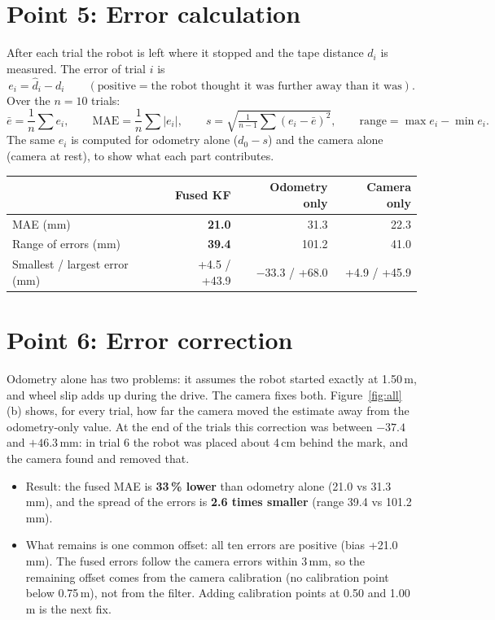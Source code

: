 \documentclass[11pt,a4paper]{article}
\begin{document}
\section{Point 5: Error calculation}
After each trial the robot is left where it stopped and the tape distance $d_i$ is measured. The error of trial $i$ is
\begin{equation}
e_i=\hat d_i-d_i\qquad(\text{positive}=\text{the robot thought it was further away than it was}).
\end{equation}
Over the $n=10$ trials:
\begin{equation}
\bar e=\frac1n\sum e_i,\qquad \text{MAE}=\frac1n\sum|e_i|,\qquad s=\sqrt{\tfrac{1}{n-1}\sum(e_i-\bar e)^2},\qquad \text{range}=\max e_i-\min e_i .
\end{equation}
The same $e_i$ is computed for odometry alone ($d_0-s$) and the camera alone (camera at rest), to show what each part contributes.

\begin{center}\small
\begin{tabular}{@{}lrrr@{}}\toprule
 & \textbf{Fused KF} & Odometry only & Camera only\\\midrule
MAE (mm) & \textbf{21.0} & 31.3 & 22.3\\
Range of errors (mm) & \textbf{39.4} & 101.2 & 41.0\\
Smallest / largest error (mm) & +4.5 / +43.9 & $-33.3$ / +68.0 & +4.9 / +45.9\\
\bottomrule\end{tabular}
\end{center}

\section{Point 6: Error correction}
Odometry alone has two problems: it assumes the robot started exactly at 1.50\,m, and wheel slip adds up during the drive. The camera fixes both. Figure~\ref{fig:all}(b) shows, for every trial, how far the camera moved the estimate away from the odometry-only value. At the end of the trials this correction was between $-37.4$ and $+46.3$\,mm: in trial 6 the robot was placed about 4\,cm behind the mark, and the camera found and removed that.
\begin{itemize}
  \item Result: the fused MAE is \textbf{33\,\% lower} than odometry alone (21.0 vs 31.3\,mm), and the spread of the errors is \textbf{2.6 times smaller} (range 39.4 vs 101.2\,mm).
  \item What remains is one common offset: all ten errors are positive (bias +21.0\,mm). The fused errors follow the camera errors within 3\,mm, so the remaining offset comes from the camera calibration (no calibration point below 0.75\,m), not from the filter. Adding calibration points at 0.50 and 1.00\,m is the next fix.
\end{itemize}
\end{document}
